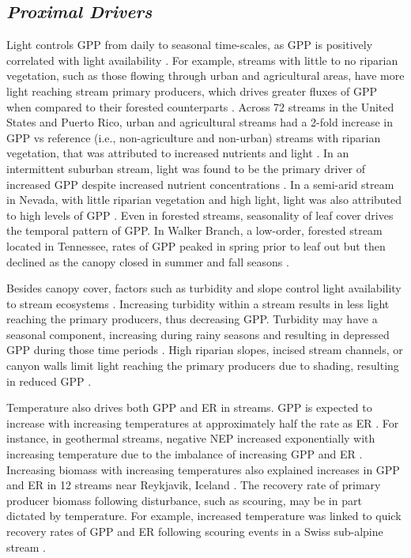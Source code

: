 \subsection{\textit{Proximal Drivers}}
Light controls GPP from daily to seasonal time-scales, as GPP is positively correlated with light availability \cite{mulholland_inter-biome_2001, roberts_multiple_2007, beaulieu_continuous_2013}. For example, streams with little to no riparian vegetation, such as those flowing through urban and agricultural areas, have more light reaching stream primary producers, which drives greater fluxes of GPP when compared to their forested counterparts \cite{bernot_inter-regional_2010, beaulieu_continuous_2013, alberts_watershed_2017}. Across 72 streams in the United States and Puerto Rico, urban and agricultural streams had a 2-fold increase in GPP vs reference (i.e., non-agriculture and non-urban) streams with riparian vegetation, that was attributed to increased nutrients and light \cite{bernot_inter-regional_2010}. In an intermittent suburban stream, light was found to be the primary driver of increased GPP despite increased nutrient concentrations \cite{beaulieu_continuous_2013}. In a semi-arid stream in Nevada, with little riparian vegetation and high light, light was also attributed to high levels of GPP \cite{davis_high_2012}. Even in forested streams, seasonality of leaf cover drives the temporal pattern of GPP. In Walker Branch, a low-order, forested stream located in Tennessee, rates of GPP peaked in spring prior to leaf out but then declined as the canopy closed in summer and fall seasons \cite{roberts_multiple_2007, alberts_watershed_2017}.

Besides canopy cover, factors such as turbidity and slope control light availability to stream ecosystems \cite{hall_turbidity_2015, blaszczak_scoured_2019}. Increasing turbidity within a stream results in less light reaching the primary producers, thus decreasing GPP. Turbidity may have a seasonal component, increasing during rainy seasons and resulting in depressed GPP during those time periods \cite{hall_turbidity_2015}. High riparian slopes, incised stream channels, or canyon walls limit light reaching the primary producers due to shading, resulting in reduced GPP \cite{hall_turbidity_2015, blaszczak_scoured_2019}.

Temperature also drives both GPP and ER in streams. GPP is expected to increase with increasing temperatures at approximately half the rate as ER \cite{perkins_consistent_2012}. For instance, in geothermal streams, negative NEP increased exponentially with increasing temperature due to the imbalance of increasing GPP and ER \cite{demars_temperature_2011}. Increasing biomass with increasing temperatures also explained increases in GPP and ER in 12 streams near Reykjavik, Iceland \cite{padfield_metabolic_2017}. The recovery rate of primary producer biomass following disturbance, such as scouring, may be in part dictated by temperature. For example, increased temperature was linked to quick recovery rates of GPP and ER following scouring events in a Swiss sub-alpine stream \cite{uehlinger_resistance_2000}. 
	
